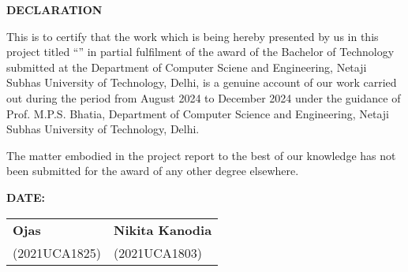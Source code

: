 \thispagestyle{plain}
\begin{center}
\large \large \textbf{DECLARATION}
\end{center}

\vspace{0.3cm}
\fontsize{12pt}{24pt}\selectfont This is to certify that the work which is being hereby presented by us in this project titled “\textbf{\btptitle}” in partial fulfilment of the award of the Bachelor of Technology submitted at the Department of Computer Sciene and Engineering, Netaji Subhas University of Technology, Delhi, is a genuine account of our work carried out during the period from August 2024 to December 2024 under the guidance of Prof. M\@.P\@.S\@. Bhatia, Department of Computer Science and Engineering, Netaji Subhas University of Technology, Delhi.

The matter embodied in the project report to the best of our knowledge has not been submitted for the award of any other degree elsewhere.
\vspace{2.0cm}

\textbf{DATE\@: } 

\vspace{4cm}

\begin{tabu} to \textwidth { X[l] X[c] }

 \textbf{Ojas} & \textbf{Nikita Kanodia} \\
 (2021UCA1825) & (2021UCA1803) \\

\end{tabu}


\newpage
